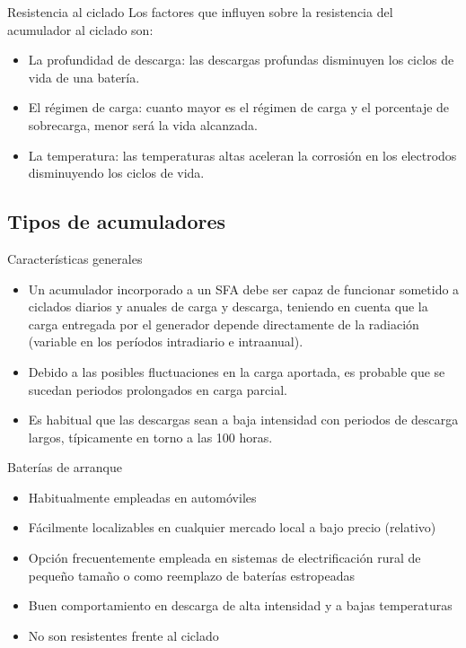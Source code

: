\documentclass[xcolor={usenames,svgnames,dvipsnames}]{beamer}
\begin{document}
\begin{frame}[label={sec:orgb5a6ec7}]{Resistencia al ciclado}
Los factores que influyen sobre la resistencia del acumulador al ciclado son: 
\begin{itemize}
\item \alert{La profundidad de descarga}: las descargas profundas disminuyen los ciclos de vida de una batería.

\item \alert{El régimen de carga}: cuanto mayor es el régimen de carga y el porcentaje de sobrecarga, menor será la vida alcanzada.

\item \alert{La temperatura}: las temperaturas altas aceleran la corrosión en los electrodos disminuyendo los ciclos de vida.
\end{itemize}
\end{frame}

\subsection{Tipos de acumuladores}
\label{sec:orgae6cf36}

\begin{frame}[label={sec:org5425fbf}]{Características generales}
\begin{itemize}
\item Un acumulador incorporado a un SFA debe ser \alert{capaz de funcionar sometido a ciclados diarios y anuales de carga y descarga}, teniendo en cuenta que la carga entregada por el generador depende directamente de la radiación (variable en los períodos intradiario e intraanual).

\item Debido a las posibles fluctuaciones en la carga aportada, es probable que se sucedan \alert{periodos prolongados en carga parcial}.

\item Es habitual que las \alert{descargas sean a baja intensidad con periodos de descarga largos}, típicamente en torno a las 100 horas.
\end{itemize}
\end{frame}

\begin{frame}[label={sec:orgdb71757}]{Baterías de arranque}
\begin{itemize}
\item Habitualmente empleadas en \alert{automóviles}

\item Fácilmente localizables en cualquier \alert{mercado local a bajo precio} (relativo)

\item \alert{Opción frecuentemente empleada} en sistemas de electrificación rural de \alert{pequeño tamaño} o como \alert{reemplazo} de baterías estropeadas

\item Buen comportamiento en descarga de alta intensidad y a bajas temperaturas

\item \alert{No son resistentes frente al ciclado}
\end{itemize}
\end{frame}
\end{document}
